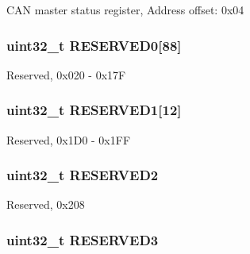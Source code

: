 C\-A\-N master status register, Address offset\-: 0x04 \hypertarget{struct_c_a_n___type_def_aae28ab86a4ae57ed057ed1ea89a6d34b}{
\subsubsection[{R\-E\-S\-E\-R\-V\-E\-D0}]{\setlength{\rightskip}{0pt plus 5cm}uint32\-\_\-t R\-E\-S\-E\-R\-V\-E\-D0\mbox{[}88\mbox{]}}}\label{struct_c_a_n___type_def_aae28ab86a4ae57ed057ed1ea89a6d34b}
Reserved, 0x020 -\/ 0x17\-F \hypertarget{struct_c_a_n___type_def_a4bb07a7828fbd5fe86f6a5a3545c177d}{
\subsubsection[{R\-E\-S\-E\-R\-V\-E\-D1}]{\setlength{\rightskip}{0pt plus 5cm}uint32\-\_\-t R\-E\-S\-E\-R\-V\-E\-D1\mbox{[}12\mbox{]}}}\label{struct_c_a_n___type_def_a4bb07a7828fbd5fe86f6a5a3545c177d}
Reserved, 0x1\-D0 -\/ 0x1\-F\-F \hypertarget{struct_c_a_n___type_def_a4c9b972a304c0e08ca27cbe57627c496}{
\subsubsection[{R\-E\-S\-E\-R\-V\-E\-D2}]{\setlength{\rightskip}{0pt plus 5cm}uint32\-\_\-t R\-E\-S\-E\-R\-V\-E\-D2}}\label{struct_c_a_n___type_def_a4c9b972a304c0e08ca27cbe57627c496}
Reserved, 0x208 \hypertarget{struct_c_a_n___type_def_af2b40c5e36a5e861490988275499e158}{
\subsubsection[{R\-E\-S\-E\-R\-V\-E\-D3}]{\setlength{\rightskip}{0pt plus 5cm}uint32\-\_\-t R\-E\-S\-E\-R\-V\-E\-D3}}\label{struct_c_a_n___type_def_af2b40c5e36a5e861490988275499e158}
